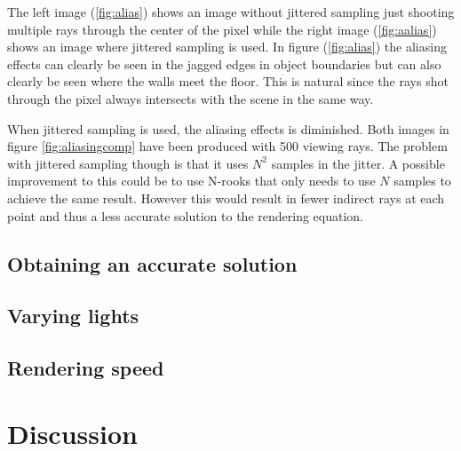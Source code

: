 \documentclass[a4paper]{report}
\begin{document}
The left image (\ref{fig:alias}) shows an image
without jittered sampling just shooting multiple rays through the
center of the pixel while the right image (\ref{fig:aalias}) shows an image where
jittered sampling is used. In figure (\ref{fig:alias}) the aliasing
effects can clearly be seen in the jagged edges in object boundaries
but can also clearly be seen where the walls meet the floor. This is
natural since the rays shot through the pixel always intersects with
the scene in the same way. 

When jittered sampling is used, the aliasing effects is
diminished. Both images in figure \ref{fig:aliasingcomp} have been
produced with 500 viewing rays. The problem with jittered sampling
though is that it uses \(N^2\) samples in the jitter. A possible
improvement to this could be to use N-rooks that only needs to use
\(N\) samples to achieve the same result. However this would result in
fewer indirect rays at each point and thus a less accurate solution to
the rendering equation.

\section{Obtaining an accurate solution}

\section{Varying lights}

\section{Rendering speed}

\chapter{Discussion}
\label{ch:discussion}




\end{document}
